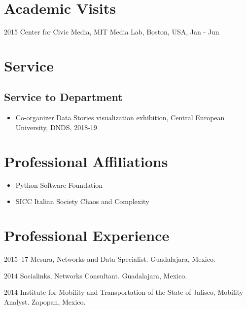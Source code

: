\documentclass{academiccv}
\begin{document}
\section*{Academic Visits}

\begin{tablist}
	
	\item[2015] 	\tab Center for Civic Media, MIT Media Lab, Boston, USA, Jan - Jun
		
\end{tablist}


\section*{Service}
\subsection*{Service to Department}
\begin{itemize}
	\item Co-organizer Data Stories visualization exhibition, Central European University, DNDS, 2018-19
\end{itemize}


\section*{Professional Affiliations}
\begin{itemize}
	\item Python Software Foundation
	\item SICC Italian Society Chaos and Complexity
\end{itemize}



\section*{Professional Experience}

\begin{tablist}
	
\item[2015--17] \tab Mesura, Networks and Data Specialist. Guadalajara, Mexico.

\item[2014] \tab Socialinks, Networks Consultant. Guadalajara, Mexico.

\item[2014] \tab Institute for Mobility and Transportation of the State of Jalisco, Mobility Analyst. Zapopan, Mexico.

\end{tablist}
\end{document}
